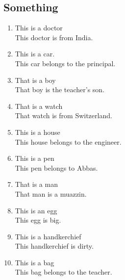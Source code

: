 \subsection{Something}
\begin{enumerate}
    \item This is a doctor \dotfill \\[0.1in]This doctor is from India. \dotfill
    \item This is a car. \dotfill \\[0.1in]This car belongs to the principal. \dotfill
    \item That is a boy \dotfill \\[0.1in]That boy is the teacher's son. \dotfill
    \item That is a watch \dotfill \\[0.1in]That watch is from Switzerland. \dotfill
    \item This is a house \dotfill \\[0.1in]This house belongs to the engineer. \dotfill
    \item This is a pen \dotfill \\[0.1in]This pen belongs to Abbas. \dotfill
    \item That is a man \dotfill \\[0.1in]That man is a muazzin. \dotfill
    \item This is an egg \dotfill \\[0.1in]This egg is big. \dotfill
    \item This is a handkerchief \dotfill \\[0.1in]This handkerchief is dirty. \dotfill
    \item This is a bag \dotfill \\[0.1in]This bag belongs to the teacher. \dotfill
\end{enumerate}

